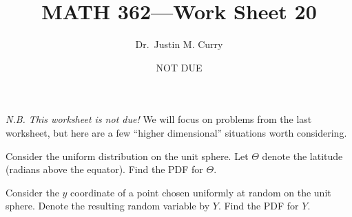 \documentclass[addpoints,12pt]{exam}
\title{\vspace{-1in} MATH 362---Work Sheet 20}
\date{NOT DUE}
\author{Dr.~Justin M. Curry}
\begin{document}
\maketitle




\emph{N.B. This worksheet is not due!} We will focus on problems from the last worksheet, but here are a few ``higher dimensional'' situations worth considering.

\begin{questions}


\question Consider the uniform distribution on the unit sphere. Let $\Theta$ denote the latitude (radians above the equator). Find the PDF for $\Theta$.

\vspace{3in}

\question Consider the $y$ coordinate of a point chosen uniformly at random on the unit sphere. Denote the resulting random variable by $Y$. Find the PDF for $Y$.
\end{questions}
\end{document}
